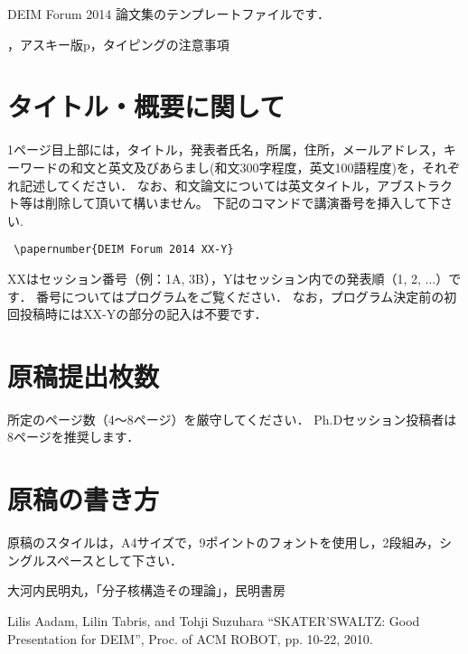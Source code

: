 \documentclass{deimj}
\begin{document}
\pagestyle{empty}
\begin{jabstract}
DEIM Forum 2014 論文集のテンプレートファイルです．
\end{jabstract}
\begin{jkeyword}
\LaTeXe{}，アスキー版p\LaTeXe{}，タイピングの注意事項
\end{jkeyword}
\maketitle

\section{タイトル・概要に関して}

1ページ目上部には，タイトル，発表者氏名，所属，住所，メールアドレス，キーワードの和文と英文及びあらまし(和文300字程度，英文100語程度)を，それぞれ記述してください．
なお、和文論文については英文タイトル，アブストラクト等は削除して頂いて構いません。
下記のコマンドで講演番号を挿入して下さい.
\begin{verbatim}
 \papernumber{DEIM Forum 2014 XX-Y}
\end{verbatim}
XXはセッション番号（例：1A, 3B），Yはセッション内での発表順（1, 2, ...）です．
番号についてはプログラムをご覧ください．
なお，プログラム決定前の初回投稿時にはXX-Yの部分の記入は不要です．

\section{原稿提出枚数}

所定のページ数（4～8ページ）を厳守してください．
Ph.Dセッション投稿者は8ページを推奨します．

\section{原稿の書き方}

原稿のスタイルは，A4サイズで，9ポイントのフォントを使用し，2段組み，シングルスペースとして下さい．

\vspace{30mm}

\begin{thebibliography}{99}
大河内民明丸，「分子核構造その理論」，民明書房

Lilis Aadam, Lilin Tabris, and Tohji Suzuhara ``SKATER'SWALTZ: Good Presentation for DEIM'', Proc. of ACM ROBOT, pp. 10-22, 2010.
\end{thebibliography}
\end{document}
